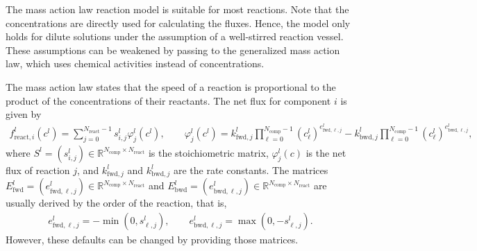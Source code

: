 The mass action law  reaction model is suitable for most reactions.
Note that the concentrations are directly used for calculating the fluxes.
Hence, the model only holds for dilute solutions under the assumption of a well-stirred reaction vessel.
These assumptions can be weakened by passing to the generalized mass action law, which uses chemical activities instead of concentrations.

The mass action law states that the speed of a reaction is proportional to the product of the concentrations of their reactants.
The net flux for component $i$ is given by
\begin{align*}
  f_{\text{react},i}^l\left(c^l\right) = \sum_{j=0}^{N_{\text{react}}-1} s_{i,j}^l \varphi^l_j\left(c^l\right), \qquad \varphi^l_j(c^l) = k^l_{\text{fwd},j} \prod_{\ell=0}^{N_{\text{comp}}-1} \left(c^l_{\ell}\right)^{e^l_{\text{fwd},\ell,j}} - k^l_{\text{bwd},j} \prod_{\ell=0}^{N_{\text{comp}}-1} \left(c^l_{\ell}\right)^{e^l_{\text{bwd},\ell,j}},
\end{align*}
where $S^l = (s^l_{i,j}) \in \mathds{R}^{N_{\text{comp}} \times N_{\text{react}}}$ is the stoichiometric matrix, $\varphi^l_j(c)$ is the net flux of reaction $j$, and $k^l_{\text{fwd},j}$ and $k^l_{\text{bwd},j}$ are the rate constants.
The matrices $E^l_{\text{fwd}} = (e^l_{\text{fwd},\ell,j}) \in \mathds{R}^{N_{\text{comp}} \times N_{\text{react}}}$ and $E^l_{\text{bwd}} = (e^l_{\text{bwd},\ell,j}) \in \mathds{R}^{N_{\text{comp}} \times N_{\text{react}}}$ are usually derived by the order of the reaction, that is,
\begin{align}
	e^l_{\text{fwd},\ell,j} = -\min(0, s^l_{\ell,j}), \qquad e^l_{\text{bwd},\ell,j} = \max(0, -s^l_{\ell,j}). \label{eq:MRMassActionLawExpMatDefault}
\end{align}
However, these defaults can be changed by providing those matrices.

